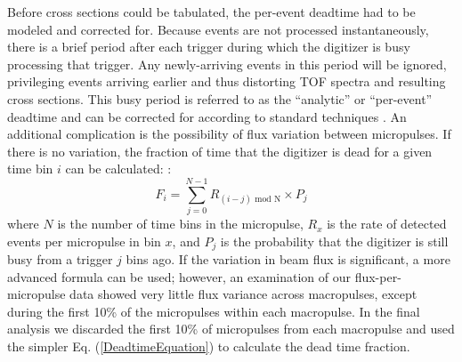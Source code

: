 \documentclass[twocolumn,secnumarabic,amssymb, nobibnotes, aps, prl,
superscriptaddress, nobalancelastpage, draft]{revtex4}
\begin{document}
Before cross sections could be tabulated, the per-event deadtime had to be
modeled and corrected for. Because events are not processed
instantaneously, there is a brief period
after each trigger during which the digitizer is busy processing that trigger.
Any newly-arriving events in this period will be ignored,
privileging events arriving earlier and thus distorting
TOF spectra and resulting cross sections. This busy period is referred to as the
``analytic'' or ``per-event'' deadtime and can be corrected for according to standard 
techniques
\cite{Moore1980}. An additional complication is the possibility of flux
variation between micropulses. If there is no variation, the fraction of time
that the digitizer is dead for a given time bin $i$ can be calculated:
\cite{Moore1980}:
\begin{equation}
    F_{i} = \sum^{N-1}_{j=0} R_{(i-j)\text{ mod N}}\times P_{j}
    \label{DeadtimeEquation}
\end{equation}
where $N$ is the number of time bins in the micropulse, $R_{x}$ is the rate of
detected events per micropulse in bin $x$, and $P_{j}$ is the probability that the
digitizer is still busy from a trigger $j$ bins ago.
If the variation in beam flux is significant, a more advanced formula can be
used; however, an examination of our flux-per-micropulse data showed
very little flux variance across macropulses, except during the first 10\%
of the micropulses within each macropulse. In the final analysis we discarded the
first 10\% of micropulses from each macropulse and used the simpler Eq.
(\ref{DeadtimeEquation}) to calculate the dead time fraction.
\end{document}
